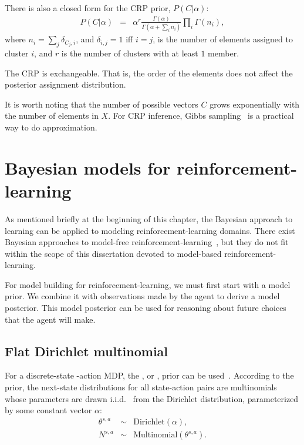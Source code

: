 There is also a closed form for the CRP prior, $P(C|\alpha)$:
\begin{eqnarray}
P(C|\alpha)&=&\alpha^r \frac {\Gamma(\alpha)}{\Gamma(\alpha+\sum_i n_i)}\prod_i\Gamma(n_i),\label{eq:crp}
\end{eqnarray}
where $n_i = \sum_{j} \delta_{C_j,i}$, and $\delta_{i,j}=1$ iff $i=j$, is the number of elements assigned to cluster $i$, and $r$ is the number of clusters with at least $1$ member.

The CRP is exchangeable. That is, the order of the elements does not affect the posterior assignment distribution.

It is worth noting that the number of possible vectors $C$ grows exponentially with the number of elements in $X$. For CRP inference, Gibbs sampling~\cite{andrieu03,neal00} is a practical way to do approximation.

\section{Bayesian models for reinforcement-learning}
\label{sec:intro:rl-models}

As mentioned briefly at the beginning of this chapter, the Bayesian approach to learning can be applied to modeling reinforcement-learning domains. There exist Bayesian approaches to model-free reinforcement-learning~\cite{dearden98}, but they do not fit within the scope of this dissertation devoted to model-based reinforcement-learning.

For model building for reinforcement-learning, we must first start with a model prior. We combine it with observations made by the agent to derive a model posterior. This model posterior can be used for reasoning about future choices that the agent will make.

\subsection{Flat Dirichlet multinomial}

\label{intro:fdm}

For a discrete-state -action MDP, the , or , prior can be used~\cite{poupart06}. According to the  prior, the next-state distributions for all state-action pairs are multinomials whose parameters are drawn i.i.d. \ from the Dirichlet distribution, parameterized by some constant vector $\alpha$:
\begin{eqnarray}
\theta^{s,a} &\sim& \mbox{Dirichlet}(\alpha),\\
N^{s,a} &\sim& \mbox{Multinomial}(\theta^{s,a}).
\end{eqnarray}

